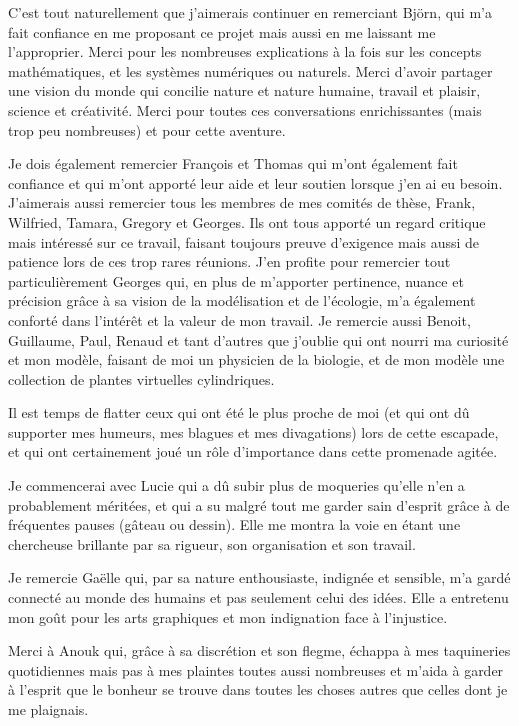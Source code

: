 \documentclass[a4paper, notoc, justified,marginals=left, nobib]{tufte-book}
\begin{document}
\begin{fullwidth}
C'est tout naturellement que j'aimerais continuer en remerciant Björn, qui m'a fait confiance en me proposant ce projet mais aussi en me laissant me l'approprier. Merci pour les nombreuses explications à la fois sur les concepts mathématiques, et les systèmes numériques ou naturels. Merci d'avoir partager une vision du monde qui concilie nature et nature humaine, travail et plaisir, science et créativité. Merci pour toutes ces conversations enrichissantes (mais trop peu nombreuses) et pour cette aventure.

Je dois également remercier François et Thomas qui m'ont également fait confiance et qui m'ont apporté leur aide et leur soutien lorsque j'en ai eu besoin. J'aimerais aussi remercier tous les membres de mes comités de thèse, Frank, Wilfried, Tamara, Gregory et Georges. Ils ont tous apporté un regard critique mais intéressé sur ce travail, faisant toujours preuve d'exigence mais aussi de patience lors de ces trop rares réunions. J'en profite pour remercier tout particulièrement Georges qui, en plus de m'apporter pertinence, nuance et précision grâce à sa vision de la modélisation et de l'écologie, m'a également conforté dans l'intérêt et la valeur de mon travail. Je remercie aussi Benoit, Guillaume, Paul, Renaud et tant d'autres que j'oublie qui ont nourri ma curiosité et mon modèle, faisant de moi un physicien de la biologie, et de mon modèle une collection de plantes virtuelles cylindriques.

\vspace{05cm}
Il est temps de flatter ceux qui ont été le plus proche de moi (et qui ont d\^u supporter mes humeurs, mes blagues et mes divagations) lors de cette escapade, et qui ont certainement joué un rôle d'importance dans cette promenade agitée.

Je commencerai avec Lucie qui a d\^u subir plus de moqueries qu'elle n'en a probablement méritées, et qui a su malgré tout me garder sain d'esprit grâce à de fréquentes pauses (gâteau ou dessin). Elle me montra la voie en étant une chercheuse brillante par sa rigueur, son organisation et son travail.

Je remercie Gaëlle qui, par sa nature enthousiaste, indignée et sensible, m'a gardé connecté au monde des humains et pas seulement celui des idées. Elle a entretenu mon goût pour les arts graphiques et mon indignation face à l'injustice.

Merci à Anouk qui, grâce à sa discrétion et son flegme, échappa à mes taquineries quotidiennes mais pas à mes plaintes toutes aussi nombreuses et m'aida à garder à l'esprit que le bonheur se trouve dans toutes les choses autres que celles dont je me plaignais.


\end{fullwidth}
\end{document}
